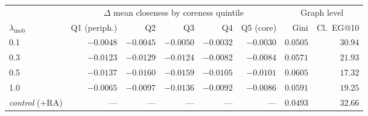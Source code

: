 \begin{tabular}{lrrrrrrr}
\toprule
 & \multicolumn{5}{c}{$\Delta$ mean closeness by coreness quintile} & \multicolumn{2}{c}{Graph level} \\
\cmidrule(lr){2-6}\cmidrule(lr){7-8}
$\lambda_{\mathrm{mob}}$ & Q1 (periph.) & Q2 & Q3 & Q4 & Q5 (core) & Gini & Cl.\ EG@10 \\
\midrule
0.1 & $-0.0048$ & $-0.0045$ & $-0.0050$ & $-0.0032$ & $-0.0030$ & $0.0505$ & $30.94$ \\
0.3 & $-0.0123$ & $-0.0129$ & $-0.0124$ & $-0.0082$ & $-0.0084$ & $0.0571$ & $21.93$ \\
0.5 & $-0.0137$ & $-0.0160$ & $-0.0159$ & $-0.0105$ & $-0.0101$ & $0.0605$ & $17.32$ \\
1.0 & $-0.0065$ & $-0.0097$ & $-0.0136$ & $-0.0092$ & $-0.0086$ & $0.0591$ & $19.25$ \\
\midrule
\emph{control} ($+$RA) & --- & --- & --- & --- & --- & $0.0493$ & $32.66$ \\
\bottomrule
\end{tabular}
